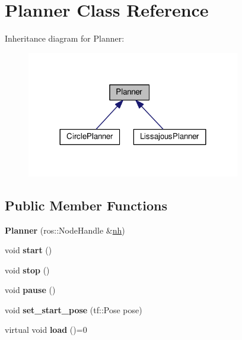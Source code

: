 \hypertarget{classPlanner}{}\section{Planner Class Reference}
\label{classPlanner}


Inheritance diagram for Planner\+:
\nopagebreak
\begin{figure}[H]
\begin{center}
\leavevmode
\includegraphics[width=264pt]{classPlanner__inherit__graph}
\end{center}
\end{figure}
\subsection*{Public Member Functions}
\begin{DoxyCompactItemize}
\item 
{\bfseries Planner} (ros\+::\+Node\+Handle \&\hyperlink{classPlanner_a9714d036f444a07ce90be8d135b9a40c}{nh})\hypertarget{classPlanner_a32475baddd401921adb1aab3ab842210}{}\label{classPlanner_a32475baddd401921adb1aab3ab842210}

\item 
void {\bfseries start} ()\hypertarget{classPlanner_a6c1c8d67d0cac41f738b413d1833c007}{}\label{classPlanner_a6c1c8d67d0cac41f738b413d1833c007}

\item 
void {\bfseries stop} ()\hypertarget{classPlanner_a3d0a3d404d39f59bfc21f275b0da408a}{}\label{classPlanner_a3d0a3d404d39f59bfc21f275b0da408a}

\item 
void {\bfseries pause} ()\hypertarget{classPlanner_a400f2aefad591e55a62e0fb13cb02521}{}\label{classPlanner_a400f2aefad591e55a62e0fb13cb02521}

\item 
void {\bfseries set\+\_\+start\+\_\+pose} (tf\+::\+Pose pose)\hypertarget{classPlanner_acaf55e0e250d6f3ba14bfcf3c4f06ffb}{}\label{classPlanner_acaf55e0e250d6f3ba14bfcf3c4f06ffb}

\item 
virtual void {\bfseries load} ()=0\hypertarget{classPlanner_af10d045ffe58c7d2149156567dc8b10a}{}\label{classPlanner_af10d045ffe58c7d2149156567dc8b10a}

\end{DoxyCompactItemize}
